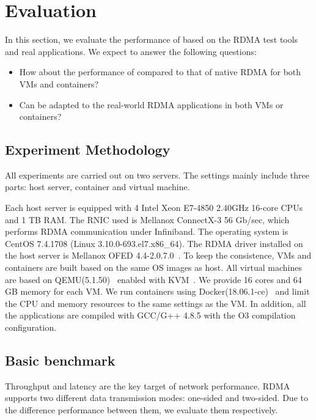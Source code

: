 \section{Evaluation} \label{eval}
In this section, we evaluate the performance of \sys based on the RDMA test tools and real applications. We expect to answer the following questions:

\begin{itemize}
\item How about the performance of \sys compared to that of native RDMA for both VMs and containers?
\item Can \sys be adapted to the real-world RDMA applications in both VMs or containers?
\end{itemize}

\subsection{Experiment Methodology}
All experiments are carried out on two servers. The settings mainly include three parts: host server, container and virtual machine. 

Each host server is equipped with 4 Intel Xeon E7-4850 2.40GHz 16-core CPUs and 1 TB RAM. The RNIC used is Mellanox ConnectX-3 56 Gb/sec, which performs RDMA communication under Infiniband.  The operating system is CentOS 7.4.1708 (Linux 3.10.0-693.el7.x86\_64). The RDMA driver installed on the host server is Mellanox OFED 4.4-2.0.7.0~\cite{mlnx-ofed}. To keep the consistence, VMs and containers are built based on the same OS images as host. All virtual machines are based on QEMU(5.1.50)~\cite{qemu} enabled with KVM~\cite{kvm}. We provide 16 cores and 64 GB memory for each VM. We run containers using Docker(18.06.1-ce)~\cite{docker} and limit the CPU and memory resources to the same settings as the VM. In addition, all the applications are compiled with GCC/G++ 4.8.5 with the O3 compilation configuration. 


\subsection{Basic benchmark}
Throughput and latency are the key target of network performance. RDMA supports two different data transmission modes: one-sided and two-sided. Due to the difference performance between them, we evaluate them respectively.

